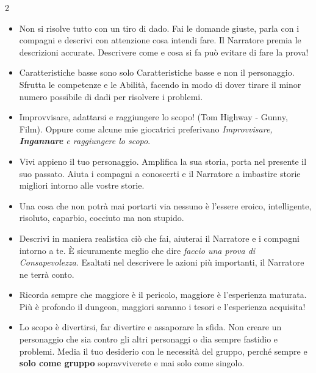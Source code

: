 \begin{multicols}{2}
\begin{itemize}[leftmargin=*]
\item
Non si risolve tutto con un tiro di dado. Fai le domande giuste, parla con i compagni e descrivi con attenzione cosa intendi fare. Il Narratore premia le descrizioni accurate. Descrivere come e cosa si fa può evitare di fare la prova!

\item
Caratteristiche basse sono solo Caratteristiche basse e non il personaggio. Sfrutta le competenze e le Abilità, facendo in modo di dover tirare il minor numero possibile di dadi per risolvere i problemi.

\item
Improvvisare, adattarsi e raggiungere lo scopo! (Tom Highway - Gunny, Film). Oppure come alcune mie giocatrici preferivano \emph{Improvvisare, \textbf{Ingannare} e raggiungere lo scopo}.

\item
Vivi appieno il tuo personaggio. Amplifica la sua storia, porta nel presente il suo passato. Aiuta i compagni a conoscerti e il Narratore a imbastire storie migliori intorno alle vostre storie.

\item
Una cosa che non potrà mai portarti via nessuno è l'essere eroico, intelligente, risoluto, caparbio, cocciuto ma non stupido.

\item
Descrivi in maniera realistica ciò che fai, aiuterai il Narratore e i compagni intorno a te. È sicuramente meglio che dire \emph{faccio una prova di Consapevolezza}. Esaltati nel descrivere le azioni più importanti, il Narratore ne terrà conto.


\item
Ricorda sempre che maggiore è il pericolo, maggiore è l'esperienza maturata. Più è profondo il dungeon, maggiori saranno i tesori e l'esperienza acquisita!

\item
Lo scopo è divertirsi, far divertire e assaporare la sfida. Non creare un personaggio che sia contro gli altri personaggi o dia sempre fastidio e problemi. Media il tuo desiderio con le necessità del gruppo, perché sempre e \textbf{solo come gruppo} sopravviverete e mai solo come singolo.


\end{itemize}
\end{multicols}
